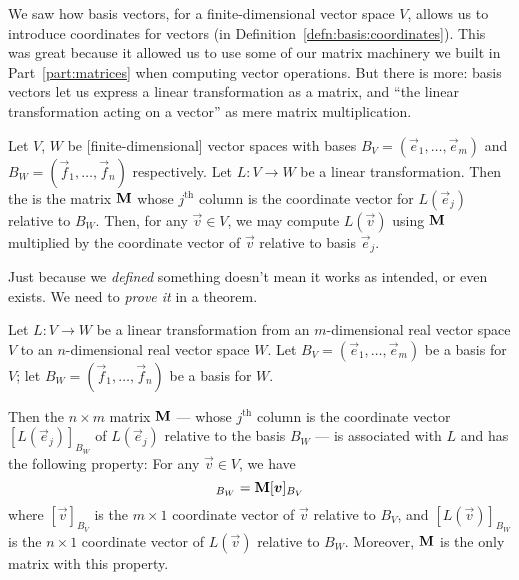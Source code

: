 \M
We saw how basis vectors, for a finite-dimensional vector space $V$,
allows us to introduce coordinates for vectors (in
Definition~\ref{defn:basis:coordinates}).
This was great because it allowed us to use some of our matrix machinery
we built in Part~\ref{part:matrices} when computing vector operations.
But there is more: basis vectors let us express a linear transformation
as a matrix, and ``the linear transformation acting on a vector'' as
mere matrix multiplication.

\begin{definition}
Let $V$, $W$ be [finite-dimensional] vector spaces with bases
$B_{V}=(\vec{e}_{1},\dots,\vec{e}_{m})$ and $B_{W}=(\vec{f}_{1},\dots,\vec{f}_{n})$
respectively. Let $L\colon V\to W$ be a linear transformation.
Then the 
is the matrix $\mathbf{M}$ whose $j^{\text{th}}$ column is the coordinate vector
for $L(\vec{e}_{j})$ relative to $B_{W}$.
Then, for any $\vec{v}\in V$, we may compute $L(\vec{v})$ using
$\mathbf{M}$ multiplied by the coordinate vector of $\vec{v}$ relative to
basis $\vec{e}_{j}$.
\end{definition}

\begin{remark}
Just because we \emph{defined} something doesn't mean it works as
intended, or even exists. We need to \emph{prove it} in a theorem.
\end{remark}

\begin{theorem}
Let $L\colon V\to W$ be a linear transformation from an $m$-dimensional
real vector space $V$ to an $n$-dimensional real vector space $W$.
Let $B_{V}=(\vec{e}_{1}, \dots, \vec{e}_{m})$ be a basis for $V$; let
$B_{W}=(\vec{f}_{1}, \dots, \vec{f}_{n})$ be a basis for $W$.

Then the $n\times m$ matrix $\mathbf{M}$ --- whose $j^{\text{th}}$ column is
the coordinate vector $[L(\vec{e}_{j})]_{B_{W}}$ of $L(\vec{e}_{j})$
relative to the basis $B_{W}$ --- is associated with $L$ and has the
following property: For any $\vec{v}\in V$, we have
\begin{equation}
[L(\vec{v})]_{B_{W}} = \mat{M}[\vec{v}]_{B_{V}}
\end{equation}
where $[\vec{v}]_{B_{V}}$ is the $m\times1$ coordinate vector of
$\vec{v}$ relative to $B_{V}$, and $[L(\vec{v})]_{B_{W}}$ is the $n\times1$
coordinate vector of $L(\vec{v})$ relative to $B_{W}$. Moreover,
$\mathbf{M}$ is the only matrix with this property.
\end{theorem}


